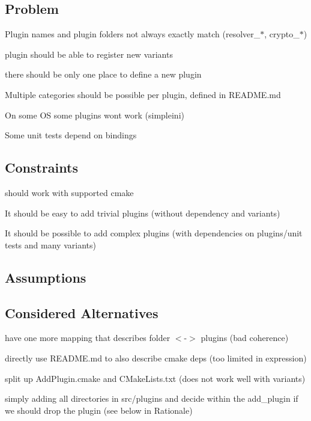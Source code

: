 \subsection*{Problem}


\begin{DoxyItemize}
\item Plugin names and plugin folders not always exactly match (resolver\+\_\+$\ast$, crypto\+\_\+$\ast$)
\item plugin should be able to register new variants
\item there should be only one place to define a new plugin
\item Multiple categories should be possible per plugin, defined in R\+E\+A\+D\+M\+E.\+md
\item On some OS some plugins won\textquotesingle{}t work (simpleini)
\item Some unit tests depend on bindings
\end{DoxyItemize}

\subsection*{Constraints}


\begin{DoxyItemize}
\item should work with supported cmake
\item It should be easy to add trivial plugins (without dependency and variants)
\item It should be possible to add complex plugins (with dependencies on plugins/unit tests and many variants)
\end{DoxyItemize}

\subsection*{Assumptions}

\subsection*{Considered Alternatives}


\begin{DoxyItemize}
\item have one more mapping that describes folder $<$-\/$>$ plugins (bad coherence)
\item directly use R\+E\+A\+D\+M\+E.\+md to also describe cmake deps (too limited in expression)
\item split up Add\+Plugin.\+cmake and C\+Make\+Lists.\+txt (does not work well with variants)
\item simply adding all directories in src/plugins and decide within the {\ttfamily add\+\_\+plugin} if we should drop the plugin (see below in Rationale)
\end{DoxyItemize}

